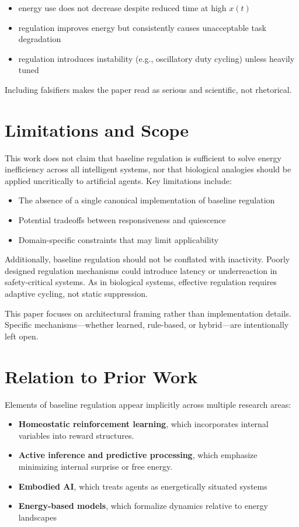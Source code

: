 \documentclass[11pt]{article}
\begin{document}
\begin{itemize}
\item energy use does not decrease despite reduced time at high \(x(t)\)
\item regulation improves energy but consistently causes unacceptable task degradation
\item regulation introduces instability (e.g., oscillatory duty cycling) unless heavily tuned
\end{itemize}

Including falsifiers makes the paper read as serious and scientific, not rhetorical.

\section{Limitations and Scope}
This work does not claim that baseline regulation is sufficient to solve energy inefficiency across all intelligent systems, nor that biological analogies should be applied uncritically to artificial agents. Key limitations include:

\begin{itemize}
\item The absence of a single canonical implementation of baseline regulation
\item Potential tradeoffs between responsiveness and quiescence
\item Domain-specific constraints that may limit applicability
\end{itemize}

Additionally, baseline regulation should not be conflated with inactivity. Poorly designed regulation mechanisms could introduce latency or underreaction in safety-critical systems. As in biological systems, effective regulation requires adaptive cycling, not static suppression. 

This paper focuses on architectural framing rather than implementation details. Specific mechanisms—whether learned, rule-based, or hybrid—are intentionally left open.

\section{Relation to Prior Work}
Elements of baseline regulation appear implicitly across multiple research areas:
\begin{itemize}

\item \textbf{Homeostatic reinforcement learning}, which incorporates internal variables into reward structures.

\item \textbf{Active inference and predictive processing}, which emphasize minimizing internal surprise or free energy.
\item \textbf{Embodied AI}, which treats agents as energetically situated systems
\item \textbf{Energy-based models}, which formalize dynamics relative to energy landscapes
\end{itemize}
\end{document}
